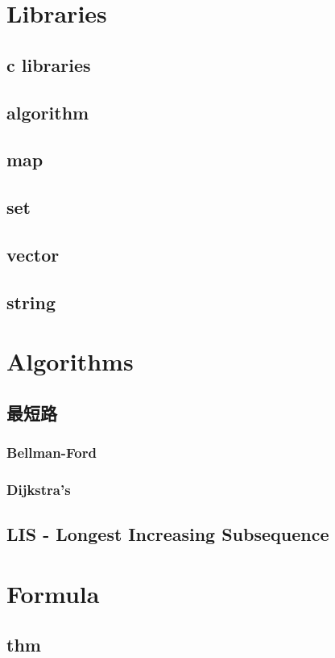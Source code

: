 \section{Libraries}
    \subsection{c libraries}
    \subsection{algorithm}
        
    \subsection{map}
    \subsection{set}
    \subsection{vector}
    \subsection{string}

\section{Algorithms}
    \subsection{最短路}
        \subsubsection{Bellman-Ford}
        \subsubsection{Dijkstra’s}
    \subsection{LIS - Longest Increasing Subsequence}

\section{Formula}
    \subsection{thm}
        